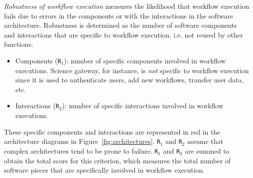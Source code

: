 \documentclass[preprint,3p,twocolumn]{elsarticle}
\begin{document}
\emph{Robustness of workflow execution} measures the likelihood that
workflow execution fails due to errors in the components or with the
interactions in the software architecture. 
Robustness is determined as the number of software components and
interactions that are specific to workflow execution, i.e. not reused
by other functions:
\begin{itemize}[leftmargin=0cm,itemindent=0.35cm,itemsep=0cm]
\item Components (\texttt{R$_1$}): number of specific components
  involved in workflow executions. Science
gateway, for instance, is \emph{not} specific to workflow execution
since it is used to authenticate users, add new workflows, transfer
user data, etc. 
\item Interactions (\texttt{R$_2$}): number of specific interactions
  involved in workflow executions.
\end{itemize}
These specific components and interactions are represented in red in
the architecture diagrams in
Figure~\ref{fig:architectures}. \texttt{R$_1$} and \texttt{R$_2$}
assume that complex architectures tend to be prone to
failure. \texttt{R$_1$} and \texttt{R$_2$}  are summed to obtain the total score for this
criterion, which measures the total number of software pieces that are
specifically involved in workflow execution.
\end{document}
